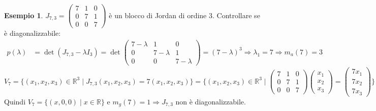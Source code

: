 \documentclass[a4paper]{article}
\theoremstyle{definition}
\newtheorem*{es}{Esempio}
\begin{document}
	\begin{es}
		$J_{7,3} = \begin{pmatrix}
			7 & 1 & 0 \\
			0 & 7 & 1 \\
			0 & 0 & 7
		\end{pmatrix}$ è un blocco di Jordan di ordine 3.
		Controllare se è diagonalizzabile:
		\begin{align*}
			p(\lambda) &= \det(J_{7,3} - \lambda I_3) = \det \begin{pmatrix}
				7 - \lambda & 1 & 0 \\
				0 & 7 - \lambda & 1 \\
				0 & 0 & 7 - \lambda
			\end{pmatrix} = (7 - \lambda)^3 \Rightarrow \lambda_1 = 7 \Rightarrow m_a(7) = 3
		\end{align*}
		$V_7 = \{(x_1, x_2, x_3) \in \mathbb{R}^3 \mid J_{7,3}(x_1, x_2, x_3) = 7(x_1, x_2, x_3)\} = \{(x_1, x_2, x_3) \in \mathbb{R}^3 \mid \begin{pmatrix}
			7 & 1 & 0 \\
			0 & 7 & 1 \\
			0 & 0 & 7
		\end{pmatrix} \begin{pmatrix}
			x_1 \\
			x_2 \\
			x_3
		\end{pmatrix} = \begin{pmatrix}
			7x_1 \\
			7x_2 \\
			7x_3
		\end{pmatrix}\} = \begin{cases}
			7x_1 + x_2 = 7x_1 \\
			7x_2 + x_3 = 7x_2 \\
			7x_3 = 7x_3
		\end{cases} \Rightarrow \begin{cases}
			x_2 = 0 \\
			x_3 = 0
		\end{cases}$
		Quindi $V_7 = \{(x, 0, 0) \mid x \in \mathbb{R}\}$ e $m_g(7) = 1 \Rightarrow J_{7,3}$ non è diagonalizzabile.
	\end{es}
\end{document}
